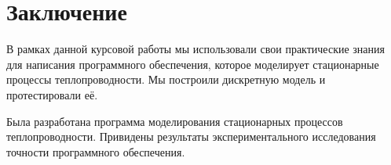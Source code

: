 \documentclass[a4paper,12pt]{article}
\begin{document}
  \newpage
  

  \newpage
  

  \newpage
  

  \newpage
  

  \newpage
  

  \newpage
  \section{Заключение}

  В рамках данной курсовой работы мы использовали свои практические знания для
  написания программного обеспечения, которое моделирует стационарные процессы
  теплопроводности. Мы построили дискретную модель и протестировали её.

  Была разработана программа моделирования стационарных процессов теплопроводности.
  Привидены результаты экспериментального исследования точности программного обеспечения.

  \newpage
  
\end{document}
